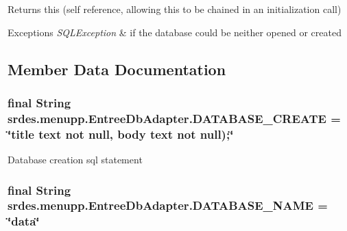 \begin{DoxyReturn}{\-Returns}
this (self reference, allowing this to be chained in an initialization call) 
\end{DoxyReturn}

\begin{DoxyExceptions}{\-Exceptions}
{\em \-S\-Q\-L\-Exception} & if the database could be neither opened or created \\
\hline
\end{DoxyExceptions}


\subsection{\-Member \-Data \-Documentation}
\hypertarget{classsrdes_1_1menupp_1_1_entree_db_adapter_a379c206abf7452b7bd33cc60f54605dc}{
\subsubsection[{\-D\-A\-T\-A\-B\-A\-S\-E\-\_\-\-C\-R\-E\-A\-T\-E}]{\setlength{\rightskip}{0pt plus 5cm}final \-String {\bf srdes.\-menupp.\-Entree\-Db\-Adapter.\-D\-A\-T\-A\-B\-A\-S\-E\-\_\-\-C\-R\-E\-A\-T\-E} = \char`\"{}title text not null, body text not null);\char`\"{}}}\label{classsrdes_1_1menupp_1_1_entree_db_adapter_a379c206abf7452b7bd33cc60f54605dc}
\-Database creation sql statement \hypertarget{classsrdes_1_1menupp_1_1_entree_db_adapter_ada7eb46ef56f9c44a86cb95ae106c91c}{
\subsubsection[{\-D\-A\-T\-A\-B\-A\-S\-E\-\_\-\-N\-A\-M\-E}]{\setlength{\rightskip}{0pt plus 5cm}final \-String {\bf srdes.\-menupp.\-Entree\-Db\-Adapter.\-D\-A\-T\-A\-B\-A\-S\-E\-\_\-\-N\-A\-M\-E} = \char`\"{}data\char`\"{}}}\label{classsrdes_1_1menupp_1_1_entree_db_adapter_ada7eb46ef56f9c44a86cb95ae106c91c}
